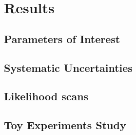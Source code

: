 
\chapter{Results}
\label{Results}

\section{Parameters of Interest}
\section{Systematic Uncertainties}
\section{Likelihood scans}
\section{Toy Experiments Study}


